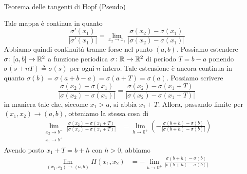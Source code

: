 \documentclass[a4paper]{article}
\begin{document}
\begin{snippetproof}{Teorema delle tangenti di Hopf (Pseudo)}
\begin{center}
    \end{center}
    Tale mappa è continua in quanto
    \[
        \frac{\sigma'(x_1)}{|\sigma'(x_1)|}
        = \lim_{x_2 \to x_1} \frac{\sigma(x_2) - \sigma(x_1)}{|\sigma(x_2) - \sigma(x_1)|}
    \]
    Abbiamo quindi continuità tranne forse nel punto \((a,b)\).
    Possiamo estendere \(\sigma \colon [a,b] \to \mathbb{R}^2\)
    a funzione periodica \(\sigma \colon \mathbb{R} \to \mathbb{R}^2\)
    di periodo \(T=b-a\) ponendo \(\sigma(s+nT) \triangleq \sigma(s)\)
    per ogni \(n\) intero.
    Tale estensione è ancora continua in quanto \(\sigma(b) = \sigma(a+b-a) = \sigma(a+T) = \sigma(a)\).
    Possiamo scrivere
    \[
        \frac{\sigma(x_2) - \sigma(x_1)}{|\sigma(x_2) - \sigma(x_1)|}
        = \frac{\sigma(x_2) - \sigma(x_1 + T)}{|\sigma(x_2) - \sigma(x_1 + T)|}
    \]
    in maniera tale che, siccome \(x_1 > a\),
    si abbia \(x_1 + T\).
    Allora, passando limite per \((x_1, x_2) \to (a,b)\), otteniamo la stessa cosa di
    \begin{align*}
        \lim_{\substack{x_2 \to b^{-} \\ x_1 \to b^{+}}}
        \frac{\sigma(x_2) - \sigma(x_1 + T)}{|\sigma(x_2) - \sigma(x_1 + T)|}
        &= \lim_{h \to 0^+}
        \left(
            - \frac{\sigma(b+h) - \sigma(b)}{|\sigma(b+h) - \sigma(b)|}
        \right)
    \end{align*}
    Avendo posto \(x_1+ T = b+h\) con \(h > 0\), abbiamo
    \begin{align*}
        \lim_{(x_1, x_2) \to (a,b)} H(x_1, x_2)
        &=  - \lim_{h \to 0^+}
            \frac{\sigma(b+h) - \sigma(b)}{|\sigma(b+h) - \sigma(b)|}

\end{align*}
\end{snippetproof}
\end{document}
